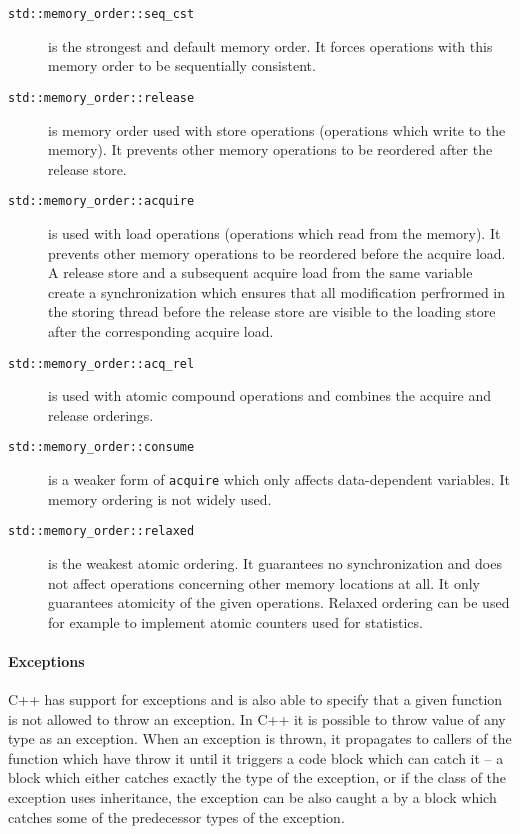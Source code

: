 \begin{description}
    \item[\texttt{std::memory\_order::seq\_cst}] is the strongest and default
        memory order.
        It forces operations with this memory order to be sequentially
        consistent.

        \item[\texttt{std::memory\_order::release}] is memory order used with
            store operations (operations which write to the memory).
            It prevents other memory operations to be reordered after the
            release store.

        \item[\texttt{std::memory\_order::acquire}] is used with load operations
            (operations which read from the memory).
            It prevents other memory operations to be reordered before the
            acquire load.
            A release store and a subsequent acquire load from the same variable
            create a synchronization which ensures that all modification
            perfrormed in the storing thread before the release store are
            visible to the loading store after the corresponding acquire load.

        \item[\texttt{std::memory\_order::acq\_rel}] is used with atomic
            compound operations and combines the acquire and release orderings.

        \item[\texttt{std::memory\_order::consume}] is a weaker form of
            \texttt{acquire} which only affects data-dependent variables.
            It memory ordering is not widely used.

        \item[\texttt{std::memory\_order::relaxed}] is the weakest atomic
            ordering.
            It guarantees no synchronization and does not affect operations
            concerning other memory locations at all.
            It only guarantees atomicity of the given operations.
            Relaxed ordering can be used for example to implement atomic
            counters used for statistics.
\end{description}

\paragraph{Exceptions}

C++ has support for exceptions and is also able to specify that a given function
is not allowed to throw an exception.
In C++ it is possible to throw value of any type as an exception.
When an exception is thrown, it propagates to callers of the function which
have throw it until it triggers a  code block which can catch it --
a  block which either catches exactly the type of the exception, or
if the class of the exception uses inheritance, the exception can be also
caught a by a  block which catches some of the predecessor types of
the exception.

